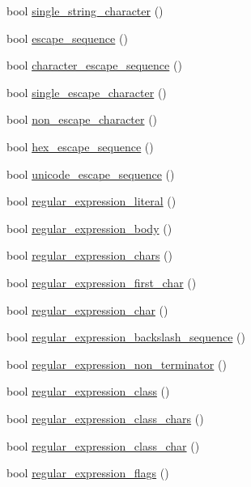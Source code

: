 \begin{DoxyCompactItemize}
bool \hyperlink{class_lexical_grammar_ae052b9eae96cf939b760c0f5e6cdfdfa}{single\+\_\+string\+\_\+character} ()
\item 
bool \hyperlink{class_lexical_grammar_aba86d71a98d0bf2f7ad78e22b1c906f0}{escape\+\_\+sequence} ()
\item 
bool \hyperlink{class_lexical_grammar_abf0678a4b3e6cf81cfb7e87fdc88a1ab}{character\+\_\+escape\+\_\+sequence} ()
\item 
bool \hyperlink{class_lexical_grammar_a5ef26a3dd4d2c39ba5016675d3afa8dd}{single\+\_\+escape\+\_\+character} ()
\item 
bool \hyperlink{class_lexical_grammar_a6c3dc0efec370cfadc61e11ae53af449}{non\+\_\+escape\+\_\+character} ()
\item 
bool \hyperlink{class_lexical_grammar_a76722915a4ae4e864ffd7c750da8c9aa}{hex\+\_\+escape\+\_\+sequence} ()
\item 
bool \hyperlink{class_lexical_grammar_a411dd476c213ddb338a80766596d0d74}{unicode\+\_\+escape\+\_\+sequence} ()
\item 
bool \hyperlink{class_lexical_grammar_a86df93444a68819148ce938342342b84}{regular\+\_\+expression\+\_\+literal} ()
\item 
bool \hyperlink{class_lexical_grammar_ac4fed727bab8e01ddef683e8638f3975}{regular\+\_\+expression\+\_\+body} ()
\item 
bool \hyperlink{class_lexical_grammar_a21d16ea0d1b6b26e45da2e0af6149fbc}{regular\+\_\+expression\+\_\+chars} ()
\item 
bool \hyperlink{class_lexical_grammar_afc3a2aeab485760400e58836e00c3d70}{regular\+\_\+expression\+\_\+first\+\_\+char} ()
\item 
bool \hyperlink{class_lexical_grammar_ad48826aa5f41c65db545c80f791251b2}{regular\+\_\+expression\+\_\+char} ()
\item 
bool \hyperlink{class_lexical_grammar_ab25a92427eff914c4a1b01cd15cae9c5}{regular\+\_\+expression\+\_\+backslash\+\_\+sequence} ()
\item 
bool \hyperlink{class_lexical_grammar_a759b85cb75cdfbad63325a40d117b5ad}{regular\+\_\+expression\+\_\+non\+\_\+terminator} ()
\item 
bool \hyperlink{class_lexical_grammar_a4ea2fac37d3c75b080966f3dc0fb9fe4}{regular\+\_\+expression\+\_\+class} ()
\item 
bool \hyperlink{class_lexical_grammar_a77f711dd4ef77b6ab36222ec0914ef8c}{regular\+\_\+expression\+\_\+class\+\_\+chars} ()
\item 
bool \hyperlink{class_lexical_grammar_a13f847b3be28cea576bf29ad7d779c48}{regular\+\_\+expression\+\_\+class\+\_\+char} ()
\item 
bool \hyperlink{class_lexical_grammar_adf9549c929bfd16abf7b7b880c9ee3cf}{regular\+\_\+expression\+\_\+flags} ()
\end{DoxyCompactItemize}
